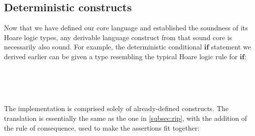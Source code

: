 \documentclass[sigplan]{acmart}%
\begin{document}
\subsection{Deterministic constructs}
Now that we have defined our core language and established the soundness of its Hoare logic
types, any derivable language construct from that sound core 
is necessarily also sound. For example, the deterministic conditional $\textbf{if}$ 
statement we derived earlier can be given a type resembling the typical Hoare logic 
rule for $\textbf{if}$:
\begin{code}
\>[2]%
\>[994I]\AgdaSymbol{:}\AgdaSpace{}%
\AgdaSymbol{(}\AgdaSpace{}%
\AgdaSymbol{:}\AgdaSpace{}%
\AgdaSymbol{)}\<%
\\
\>[.][@{}l@{}]\<[994I]%
\>[13]\AgdaSpace{}%
\AgdaOperator{\AgdaDatatype{[}}\AgdaSpace{}%
\AgdaSpace{}%
\AgdaSpace{}%
\AgdaSpace{}%
\AgdaOperator{\AgdaDatatype{,}}\AgdaSpace{}%
\AgdaSpace{}%
\AgdaOperator{\AgdaDatatype{]}}\<%
\\
%
\>[13]\AgdaSpace{}%
\AgdaOperator{\AgdaDatatype{[}}\AgdaSpace{}%
\AgdaSpace{}%
\AgdaSpace{}%
\AgdaSpace{}%
\AgdaSpace{}%
\AgdaOperator{\AgdaDatatype{,}}\AgdaSpace{}%
%
\>[30]\AgdaOperator{\AgdaDatatype{]}}\<%
\\
%
\>[13]\AgdaSpace{}%
\AgdaOperator{\AgdaDatatype{[}}\AgdaSpace{}%
\AgdaSpace{}%
\AgdaOperator{\AgdaDatatype{,}}\AgdaSpace{}%
\AgdaSpace{}%
\AgdaOperator{\AgdaDatatype{]}}\<%
\end{code}
The implementation is comprised solely of already-defined 
constructs. The translation is essentially the same as the one in \autoref{subsec:rip}, 
with the addition of the rule of consequence, used to make the assertions fit together:
\begin{code}
\>[2]\AgdaSpace{}%
\AgdaSpace{}%
\AgdaSpace{}%
\<%
\\
\>[2][@{}l@{\AgdaIndent{0}}]%
\>[4]\AgdaSymbol{=}\AgdaSpace{}%
%
\>[1021I]\AgdaSymbol{(}\AgdaSpace{}%
\AgdaSymbol{(}\AgdaSpace{}%
\AgdaSymbol{(}\AgdaSpace{}%
\AgdaOperator{\AgdaInductiveConstructor{\AgdaUnderscore{},\AgdaUnderscore{}}}\AgdaSymbol{)}\AgdaSpace{}%
\AgdaSymbol{(}\AgdaSpace{}%
\AgdaSymbol{))}\AgdaSpace{}%
\AgdaSymbol{)}\<%
\\
\>[.][@{}l@{}]\<[1021I]%
\>[10]\AgdaSymbol{(}\AgdaSpace{}%
\AgdaSymbol{(}\AgdaSpace{}%
\AgdaSymbol{(}\AgdaSpace{}%
\AgdaOperator{\AgdaInductiveConstructor{\AgdaUnderscore{},\AgdaUnderscore{}}}\AgdaSymbol{)}\AgdaSpace{}%
\AgdaSymbol{(}\AgdaSpace{}%
\AgdaSymbol{(}\AgdaSpace{}%
\AgdaSymbol{)))}\AgdaSpace{}%
\AgdaSymbol{)}\<%
\end{code}
\end{document}
